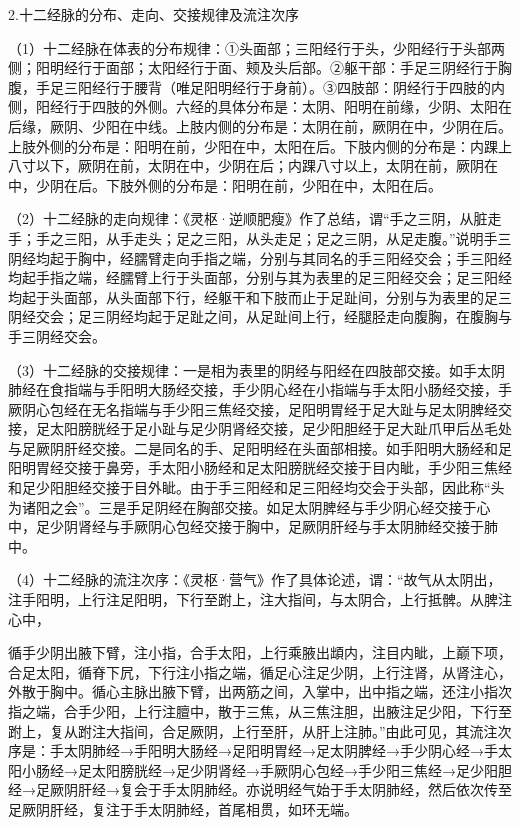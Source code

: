 \documentclass[12pt]{ctexbook}%
\begin{document}
2.十二经脉的分布、走向、交接规律及流注次序

（1）十二经脉在体表的分布规律：①头面部；三阳经行于头，少阳经行于头部两侧；阳明经行于面部；太阳经行于面、颊及头后部。②躯干部：手足三阴经行于胸腹，手足三阳经行于腰背（唯足阳明经行于身前）。③四肢部：阴经行于四肢的内侧，阳经行于四肢的外侧。六经的具体分布是：太阴、阳明在前缘，少阴、太阳在后缘，厥阴、少阳在中线。上肢内侧的分布是：太阴在前，厥阴在中，少阴在后。上肢外侧的分布是：阳明在前，少阳在中，太阳在后。下肢内侧的分布是：内踝上八寸以下，厥阴在前，太阴在中，少阴在后；内踝八寸以上，太阴在前，厥阴在中，少阴在后。下肢外侧的分布是：阳明在前，少阳在中，太阳在后。

（2）十二经脉的走向规律：《灵枢·逆顺肥瘦》作了总结，谓“手之三阴，从脏走手；手之三阳，从手走头；足之三阳，从头走足；足之三阴，从足走腹。”说明手三阴经均起于胸中，经臑臂走向手指之端，分别与其同名的手三阳经交会；手三阳经均起手指之端，经臑臂上行于头面部，分别与其为表里的足三阳经交会；足三阳经均起于头面部，从头面部下行，经躯干和下肢而止于足趾间，分别与为表里的足三阴经交会；足三阴经均起于足趾之间，从足趾间上行，经腿胫走向腹胸，在腹胸与手三阴经交会。

（3）十二经脉的交接规律：一是相为表里的阴经与阳经在四肢部交接。如手太阴肺经在食指端与手阳明大肠经交接，手少阴心经在小指端与手太阳小肠经交接，手厥阴心包经在无名指端与手少阳三焦经交接，足阳明胃经于足大趾与足太阴脾经交接，足太阳膀胱经于足小趾与足少阴肾经交接，足少阳胆经于足大趾爪甲后丛毛处与足厥阴肝经交接。二是同名的手、足阳明经在头面部相接。如手阳明大肠经和足阳明胃经交接于鼻旁，手太阳小肠经和足太阳膀胱经交接于目内眦，手少阳三焦经和足少阳胆经交接于目外眦。由于手三阳经和足三阳经均交会于头部，因此称“头为诸阳之会”。三是手足阴经在胸部交接。如足太阴脾经与手少阴心经交接于心中，足少阴肾经与手厥阴心包经交接于胸中，足厥阴肝经与手太阴肺经交接于肺中。

（4）十二经脉的流注次序：《灵枢·营气》作了具体论述，谓：“故气从太阴出，注手阳明，上行注足阳明，下行至跗上，注大指间，与太阴合，上行抵髀。从脾注心中，

循手少阴出腋下臂，注小指，合手太阳，上行乘腋出䪼内，注目内眦，上巅下项，合足太阳，循脊下凥，下行注小指之端，循足心注足少阴，上行注肾，从肾注心，外散于胸中。循心主脉出腋下臂，出两筋之间，入掌中，出中指之端，还注小指次指之端，合手少阳，上行注膻中，散于三焦，从三焦注胆，出腋注足少阳，下行至跗上，复从跗注大指间，合足厥阴，上行至肝，从肝上注肺。”由此可见，其流注次序是：手太阴肺经→手阳明大肠经→足阳明胃经→足太阴脾经→手少阴心经→手太阳小肠经→足太阳膀胱经→足少阴肾经→手厥阴心包经→手少阳三焦经→足少阳胆经→足厥阴肝经→复会于手太阴肺经。亦说明经气始于手太阴肺经，然后依次传至足厥阴肝经，复注于手太阴肺经，首尾相贯，如环无端。
\end{document}
